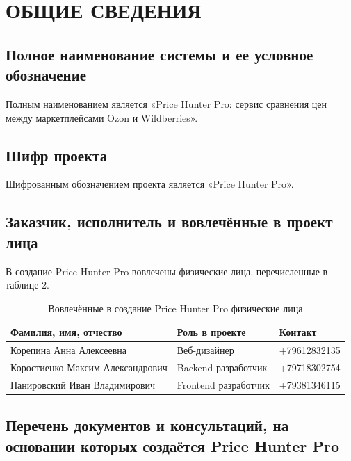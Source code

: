 \documentclass[a4paper,12pt]{article}
\begin{document}
\newpage

\section{ОБЩИЕ СВЕДЕНИЯ}

\subsection{Полное наименование системы и ее условное обозначение}
Полным наименованием является «Price Hunter Pro: сервис сравнения цен
между маркетплейсами Ozon и Wildberries».

\subsection{Шифр проекта}
Шифрованным обозначением проекта является «Price Hunter Pro».

\subsection{Заказчик, исполнитель и вовлечённые в проект лица}
В создание Price Hunter Pro вовлечены физические лица, перечисленные в таблице 2.

\begin{table}[h]
    \centering
    \caption{Вовлечённые в создание Price Hunter Pro физические лица}
    \begin{tabular}{|p{4cm}|p{5cm}|p{4cm}|}
        \hline
        \textbf{Фамилия, имя, отчество} & \textbf{Роль в проекте} & \textbf{Контакт} \\
        \hline
        Корепина Анна Алексеевна & Веб-дизайнер & +79612832135 \\
        \hline
        Коростиенко Максим Александрович & Backend разработчик & +79718302754 \\
        \hline
        Панировский Иван Владимирович & Frontend разработчик & +79381346115 \\
        \hline
    \end{tabular}
\end{table}

\subsection{Перечень документов и консультаций, на основании которых создаётся Price Hunter Pro}
\end{document}
